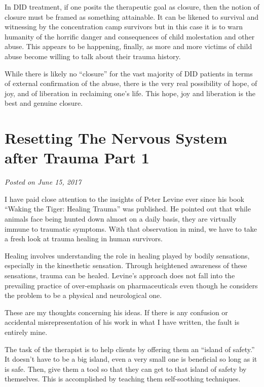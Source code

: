 \documentclass[]{book}
\begin{document}
In DID treatment, if one posits the therapeutic goal as closure, then the notion of closure must be framed as something attainable. It can be likened to survival and witnessing by the concentration camp survivors but in this case it is to warn humanity of the horrific danger and consequences of child molestation and other abuse. This appears to be happening, finally, as more and more victims of child abuse become willing to talk about their trauma history.

While there is likely no ``closure'' for the vast majority of DID patients in terms of external confirmation of the abuse, there is the very real possibility of hope, of joy, and of liberation in reclaiming one's life. This hope, joy and liberation is the best and genuine closure.

\hypertarget{resetting-the-nervous-system-after-trauma-part-1}{%
\section{Resetting The Nervous System after Trauma Part 1}\label{resetting-the-nervous-system-after-trauma-part-1}}

\emph{Posted on June 15, 2017}

I have paid close attention to the insights of Peter Levine ever since his book ``Waking the Tiger: Healing Trauma'' was published. He pointed out that while animals face being hunted down almost on a daily basis, they are virtually immune to traumatic symptoms. With that observation in mind, we have to take a fresh look at trauma healing in human survivors.

Healing involves understanding the role in healing played by bodily sensations, especially in the kinesthetic sensation. Through heightened awareness of these sensations, trauma can be healed. Levine's approach does not fall into the prevailing practice of over-emphasis on pharmaceuticals even though he considers the problem to be a physical and neurological one.

These are my thoughts concerning his ideas. If there is any confusion or accidental misrepresentation of his work in what I have written, the fault is entirely mine.

The task of the therapist is to help clients by offering them an ``island of safety.'' It doesn't have to be a big island, even a very small one is beneficial so long as it is safe. Then, give them a tool so that they can get to that island of safety by themselves. This is accomplished by teaching them self-soothing techniques.
\end{document}

